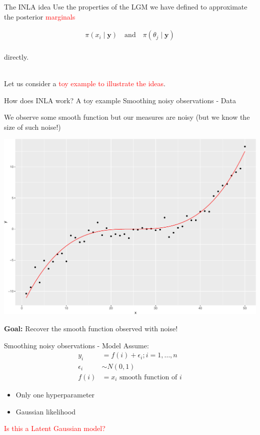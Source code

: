 \documentclass[
  ignorenonframetext,
]{beamer}
\begin{document}
\begin{frame}{The INLA idea}
\protect\hypertarget{the-inla-idea}{}
Use the properties of the LGM we have defined to approximate the
posterior \textcolor{red}{marginals}

\[
\begin{aligned}
        \pi(x_i \mid \boldsymbol{y})\quad \text{and} \quad \pi(\theta_j \mid \boldsymbol{y})
    \end{aligned}
\]\\
directly.\\
\strut \\
Let us consider a \textcolor{red}{toy example to illustrate the ideas}.
\end{frame}

\begin{frame}{How does INLA work? A toy example}
\protect\hypertarget{how-does-inla-work-a-toy-example}{}
Smoothing noisy observations - Data

We observe some smooth function but our measures are noisy (but we know
the size of such noise!)

\begin{center}\includegraphics[width=0.6\linewidth]{Part1_intro_files/figure-beamer/unnamed-chunk-11-1} \end{center}

\textbf{Goal:} Recover the smooth function observed with noise!
\end{frame}

\begin{frame}{Smoothing noisy observations - Model}
\protect\hypertarget{smoothing-noisy-observations---model}{}
Assume: \begin{align*}
y_i &= f(i) + \epsilon_i; i = 1,\dots,n \\\nonumber
\epsilon_i&\sim N(0,1) \\\nonumber
f(i) &= x_i\text{ smooth function of } i\nonumber
\end{align*}

\begin{itemize}
\item
  Only one hyperparameter
\item
  Gaussian likelihood
\end{itemize}

\textcolor{red}{Is this a Latent Gaussian model?}
\end{frame}
\end{document}
